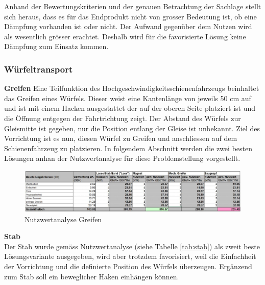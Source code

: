 \documentclass[../../main.tex]{subfiles}
\begin{document}
Anhand der Bewertungskriterien und der genauen Betrachtung der Sachlage stellt sich heraus, dass es für das Endprodukt nicht von grosser Bedeutung ist, ob eine Dämpfung vorhanden ist oder nicht. Der Aufwand gegenüber dem Nutzen wird als wesentlich grösser erachtet. Deshalb wird für die favorisierte Lösung keine Dämpfung zum Einsatz kommen.

\subsubsection{Würfeltransport}

\textbf{Greifen}
 Eine Teilfunktion des Hochgeschwindigkeitsschienenfahrzeugs beinhaltet das Greifen eines Würfels. Dieser weist eine Kantenlänge von jeweils 50 cm auf und ist mit einem Hacken ausgestattet der auf der oberen Seite platziert ist und die Öffnung entgegen der Fahrtrichtung zeigt. Der Abstand des Würfels zur Gleismitte ist gegeben, nur die Position entlang der Gleise ist unbekannt. Ziel des Vorrichtung ist es nun, diesen Würfel zu Greifen und anschliessen auf dem Schienenfahrzeug zu platzieren. In folgendem Abschnitt werden die zwei besten Lösungen anhan der Nutzwertanalyse für diese Problemstellung vorgestellt.

 \begin{figure}[H] %
    \centering
    \includegraphics[width=1\textwidth]{Greifen}
    \caption{Nutzwertanalyse Greifen}
    \label{fig:greifen}
\end{figure}

     \textbf{Stab}\\
 Der Stab wurde gemäss Nutzwertanalyse (siehe Tabelle \ref{tab:stab}) als zweit beste Lösungsvariante ausgegeben, wird aber trotzdem favorisiert, weil die Einfachheit der Vorrichtung und die definierte Position des Würfels überzeugen. Ergänzend zum Stab soll ein beweglicher Haken einhängen können.

\end{document}
